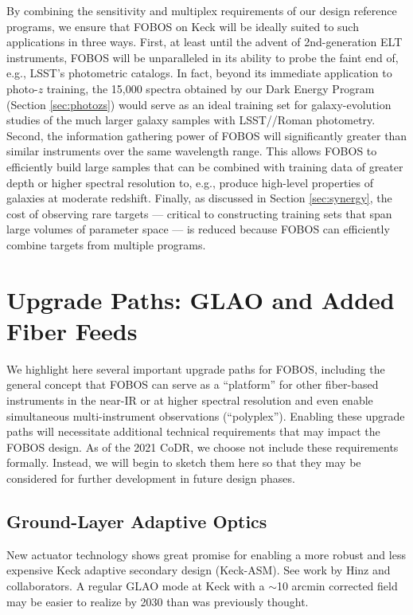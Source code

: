 \documentclass[11pt,a4paper,twoside,onecolumn,openany,final,oldfontcommands]{memoir}
\begin{document}
By combining the sensitivity and multiplex requirements of our design reference programs, we ensure that FOBOS on Keck will be ideally suited to such applications in three ways.  First, at least until the advent of 2nd-generation ELT instruments, FOBOS will be unparalleled in its ability to probe the faint end of, e.g., LSST's photometric catalogs. In fact, beyond its immediate application to photo-$z$ training, the 15,000 spectra obtained by our Dark Energy Program (Section \ref{sec:photozs}) would serve as an ideal training set for galaxy-evolution studies of the much larger galaxy samples with LSST/\euclid/Roman photometry.  Second, the information gathering power of FOBOS will significantly greater than similar instruments over the same wavelength range.  This allows FOBOS to efficiently build large samples that can be combined with training data of greater depth or higher spectral resolution to, e.g., produce high-level properties of galaxies at moderate redshift.  Finally, as discussed in Section \ref{sec:synergy}, the cost of observing rare targets --- critical to constructing training sets that span large volumes of parameter space --- is reduced because FOBOS can efficiently combine targets from multiple programs.

\section{Upgrade Paths: GLAO and Added Fiber Feeds}

We highlight here several important upgrade paths for FOBOS, including the general concept that FOBOS can serve as a ``platform'' for other fiber-based instruments in the near-IR or at higher spectral resolution and even enable simultaneous multi-instrument observations (``polyplex'').  Enabling these upgrade paths will necessitate additional technical requirements that may impact the FOBOS design.  As of the 2021 CoDR, we choose not include these requirements formally.  Instead, we will begin to sketch them here so that they may be considered for further development in future design phases.

\subsection{Ground-Layer Adaptive Optics}

New actuator technology shows great promise for enabling a more robust and less expensive Keck adaptive secondary design (Keck-ASM). See work by Hinz and collaborators.  A regular GLAO mode at Keck with a $\sim$10 arcmin corrected field may be easier to realize by 2030 than was previously thought.
\end{document}
